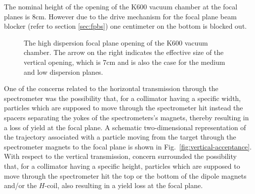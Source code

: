 \documentclass[11pt]{report}
\begin{document}
The nominal height of the opening of the K600 vacuum chamber at the focal planes
is 8cm. However due to the drive mechanism for the focal plane beam blocker
(refer to section \ref{sec:fpbs}) one centimeter on the bottom is blocked out.
\begin{figure}
\centerline{\vspace{0cm}\hspace{0cm}
}
\centering
\caption{The high dispersion focal plane opening of the K600 vacuum chamber. 
The arrow on the right indicates the effective size of the vertical opening, which is 7cm 
and is also the case for the medium and low dispersion planes.}
\label{fig:highdispexit}
\end{figure} 
\bigskip

\bigskip



One of the concerns related to the horizontal transmission 
through the spectrometer was the possibility that, for a collimator 
having a specific width,  
particles which are supposed to move through the spectrometer
hit instead the spacers
separating the yokes of the spectrometers's magnets, 
thereby resulting in a loss of yield at the 
focal plane.
A schematic two-dimensional 
representation of the trajectory 
associated with a particle
moving from the target through the  spectrometer 
magnets to the  focal plane
is shown in Fig.~\ref{fig:vertical-acceptance}.
With respect to the vertical transmission,
concern surrounded the possibility that, for a collimator 
having a specific height,  
particles which are supposed to move through the spectrometer
hit the top or the bottom of the dipole magnets
and/or the $H$-coil, also resulting in a yield loss at the focal plane.
\end{document}
